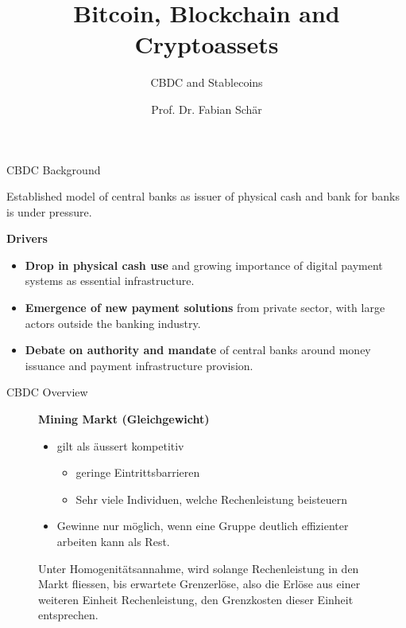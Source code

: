 \documentclass[handout]{beamer}
\title{Bitcoin, Blockchain and Cryptoassets}
\subtitle{CBDC and Stablecoins}
\author{Prof. Dr. Fabian Schär}
\institute{University of Basel}
\begin{document}
\thispagestyle{empty}
\begin{frame}[noframenumbering]
	\titlepage
\end{frame}


\begin{frame}{CBDC Background}

Established model of central banks as issuer of physical cash and bank for banks is under pressure.
\vspace{1.5em}	

\textbf{Drivers}
\begin{itemize}
	\item \textbf{Drop in physical cash use} and growing importance of digital payment systems as essential infrastructure.
	\item \textbf{Emergence of new payment solutions} from private sector, with large actors outside the banking industry.
	\item \textbf{Debate on authority and mandate} of central banks around money issuance and payment infrastructure provision.
\end{itemize}

\end{frame}

\begin{frame}{CBDC Overview}

\begin{figure}[htbp]
	\begin{minipage}{0.5\textwidth} 
		\textbf{Mining Markt \small{(Gleichgewicht)}}\small
  		\begin{itemize}
    		\item gilt als äussert kompetitiv
      		\begin{itemize}
        		\item geringe Eintrittsbarrieren 
        		\item Sehr viele Individuen, welche Rechenleistung beisteuern
      		\end{itemize}
    		\item Gewinne nur möglich, wenn eine Gruppe deutlich effizienter arbeiten kann als Rest.
  		\end{itemize}
Unter Homogenitätsannahme, wird solange Rechenleistung in den Markt fliessen, bis erwartete Grenzerlöse, also die Erlöse aus einer weiteren Einheit Rechenleistung, den Grenzkosten dieser Einheit entsprechen.
        \end{minipage}
	    \hfill
	     \begin{minipage}{0.45\textwidth} 
  \center

    	    \end{minipage}
    \end{figure}
	
\end{frame}
\end{document}
